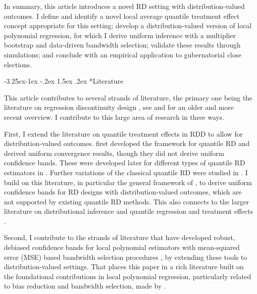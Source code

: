 \documentclass[12pt]{article}
\makeatletter
\renewcommand\subsection{\@startsection{subsection}{2}{\z@}%
  {-3.25ex\@plus -1ex \@minus -.2ex}%
  {1.5ex \@plus .2ex}%
  {\itshape\large\center}} %
\makeatother
\begin{document}
In summary, this article introduces a novel RD setting with distribution-valued outcomes. I define and identify a novel local average quantile treatment effect concept appropriate for this setting; develop a distribution-valued version of local polynomial regression, for which I derive uniform inference with a multiplier bootstrap and data-driven bandwidth selection; validate these results through simulations; and conclude with an empirical application to gubernatorial close elections.



\subsection*{Literature}

This article contributes to several strands of literature, the primary one being the literature on regression discontinuity design \citep{thistlethwaite1960regression, hahn2001identification}, see \citet{lee2010regression} and \citet{cattaneo2022regression} for an older and more recent overview. I contribute to this large area of research in three ways. 

First, I extend the literature on quantile treatment effects in RDD to allow for distribution-valued outcomes. \citet{frandsen2012quantile} first developed the framework for quantile RD and derived uniform convergence results, though they did not derive uniform confidence bands. These were developed later for different types of quantile RD estimators in \citet{qu2019uniform, qu2024inference, chiang2019robust}. Further variations of the classical quantile RD were studied in \citet{jin2025identification, chiang2019causal, qu2024inference, chen2020quantile}. I build on this literature, in particular the general framework of \citet{chiang2019robust}, to derive uniform confidence bands for RD designs with distribution-valued outcomes, which are not supported by existing quantile RD methods. This also connects to the larger literature on distributional inference \citep{chernozhukov2013inference} and quantile regression and treatment effects \citep{koenker1978regression, firpo2009unconditional, firpo2007efficient, chernozhukov2005iv}. 

Second, I contribute to the strands of literature that have developed robust, debiased confidence bands for local polynomial estimators with mean-squared error (MSE) based bandwidth selection procedures \citep{calonico2014robust, calonico2018effect, calonico2020optimal, calonico2022coverage, armstrong2018optimal, imbens2012optimal}, by extending these tools to distribution-valued settings. That places this paper in a rich literature built on the foundational contributions in local polynomial regression, particularly related to bias reduction and bandwidth selection, made by \citet{fan1992variable, fan1993local, fan1995adaptive, linton1994multiplicative}.
\end{document}
